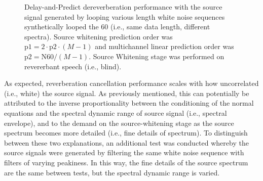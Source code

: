 \begin{figure}[H]
	\vspace{1em}
	
	\label{subfig:params_source_spectrum_compare:C}
	
	\caption{Delay-and-Predict dereverberation performance with the source signal generated by looping various length white noise sequences synthetically looped the \qty{60}{\sec} (i.e., same data length, different spectra). Source whitening prediction order was $\mathrm{p1} = 2 \cdot \mathrm{p2} \cdot (M-1)$ and multichannel linear prediction order was $\mathrm{p2} = \mathrm{N60} / (M-1)$. Source Whitening stage was performed on revererbant speech (i.e., blind).}
	\label{fig:params_source_spectrum_compare}
	
\end{figure}

As expected, reverberation cancellation performance scales with how uncorrelated (i.e., white) the source signal. As previously mentioned, this can potentially be attributed to the inverse proportionality between the conditioning of the normal equations and the spectral dynamic range of source signal (i.e., spectral envelope), and to the demand on the source-whitening stage as the source spectrum becomes more detailed (i.e., fine details of spectrum). To distinguish between these two explanations, an additional test was conducted whereby the source signals were generated by filtering the same white noise sequence with filters of varying peakiness. In this way, the fine details of the source spectrum are the same between tests, but the spectral dynamic range is varied.

